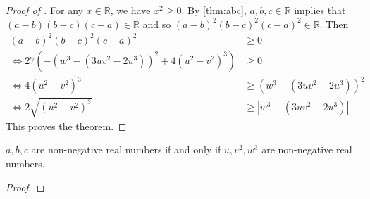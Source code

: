 \documentclass{subfile}
\begin{document}
		\begin{proof}[Proof of ]
			For any $x\in\mathbb{R}$, we have $x^{2}\geq 0$. By \eqref{thm:abc}, $a,b,c\in\mathbb{R}$ implies that $(a-b)(b-c)(c-a)\in\mathbb{R}$ and so $(a-b)^{2}(b-c)^{2}(c-a)^{2}\in\mathbb{R}$. Then
				\begin{align*}
					(a-b)^{2}(b-c)^{2}(c-a)^{2}
						& \geq 0\\
					\iff 27\left(-(w^{3}-(3uv^{2}-2u^{3}))^{2}+4(u^{2}-v^{2})^{3}\right)
						& \geq 0\\
					\iff 4(u^{2}-v^{2})^{3}
						& \geq (w^{3}-(3uv^{2}-2u^{3}))^{2}\\
					\iff 2\sqrt{(u^{2}-v^{2})^{3}}
						& \geq \left|w^{3}-(3uv^{2}-2u^{3})\right|
				\end{align*}
			This proves the theorem.
		\end{proof}

		\begin{theorem}\label{thm:positivity}
			$a,b,c$ are non-negative real numbers if and only if $u,v^{2},w^{3}$ are non-negative real numbers.
		\end{theorem}

		\begin{proof}

		\end{proof}
\end{document}
